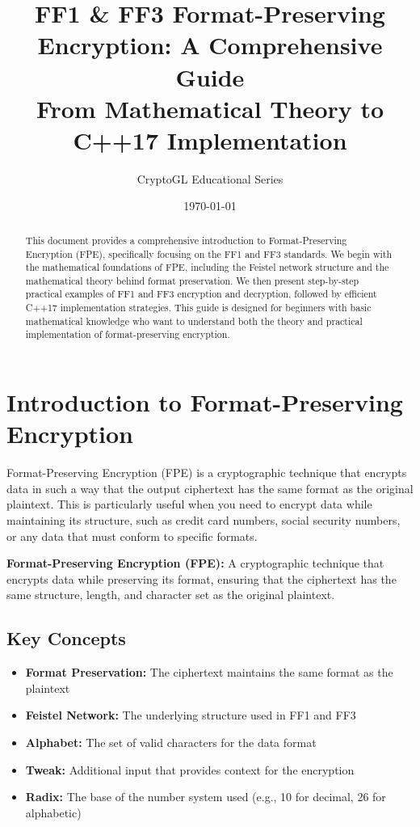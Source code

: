 \documentclass[11pt,a4paper]{article}
\title{\Huge\textbf{FF1 \& FF3 Format-Preserving Encryption: A Comprehensive Guide}\\[0.5cm]
\large From Mathematical Theory to C++17 Implementation}
\author{CryptoGL Educational Series}
\date{\today}
\begin{document}
\maketitle

\begin{abstract}
This document provides a comprehensive introduction to Format-Preserving Encryption (FPE), specifically focusing on the FF1 and FF3 standards. We begin with the mathematical foundations of FPE, including the Feistel network structure and the mathematical theory behind format preservation. We then present step-by-step practical examples of FF1 and FF3 encryption and decryption, followed by efficient C++17 implementation strategies. This guide is designed for beginners with basic mathematical knowledge who want to understand both the theory and practical implementation of format-preserving encryption.
\end{abstract}

\tableofcontents
\newpage

\section{Introduction to Format-Preserving Encryption}

Format-Preserving Encryption (FPE) is a cryptographic technique that encrypts data in such a way that the output ciphertext has the same format as the original plaintext. This is particularly useful when you need to encrypt data while maintaining its structure, such as credit card numbers, social security numbers, or any data that must conform to specific formats.

\begin{definitionbox}
\textbf{Format-Preserving Encryption (FPE):} A cryptographic technique that encrypts data while preserving its format, ensuring that the ciphertext has the same structure, length, and character set as the original plaintext.
\end{definitionbox}

\subsection{Key Concepts}

\begin{itemize}
    \item \textbf{Format Preservation:} The ciphertext maintains the same format as the plaintext
    \item \textbf{Feistel Network:} The underlying structure used in FF1 and FF3
    \item \textbf{Alphabet:} The set of valid characters for the data format
    \item \textbf{Tweak:} Additional input that provides context for the encryption
    \item \textbf{Radix:} The base of the number system used (e.g., 10 for decimal, 26 for alphabetic)
\end{itemize}
\end{document}
